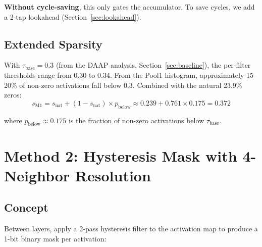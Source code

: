 \documentclass[11pt,a4paper]{article}
\begin{document}
\noindent\textbf{Without cycle-saving}, this only gates the accumulator.
To save cycles, we add a 2-tap lookahead (Section~\ref{sec:lookahead}).

\subsection{Extended Sparsity}

With $\tau_{\text{base}} = 0.3$ (from the DAAP analysis, Section~\ref{sec:baseline}),
the per-filter thresholds range from 0.30 to 0.34. From the Pool1 histogram,
approximately 15--20\% of non-zero activations fall below 0.3. Combined with
the natural 23.9\% zeros:
\begin{equation}
s_{\text{M1}} = s_{\text{nat}} + (1 - s_{\text{nat}}) \times p_{\text{below}}
\approx 0.239 + 0.761 \times 0.175 = 0.372
\end{equation}

where $p_{\text{below}} \approx 0.175$ is the fraction of non-zero activations
below $\tau_{\text{base}}$.

\section{Method 2: Hysteresis Mask with 4-Neighbor Resolution}
\label{sec:method2}

\subsection{Concept}

Between layers, apply a 2-pass hysteresis filter to the activation map to
produce a 1-bit binary mask per activation:
\end{document}
